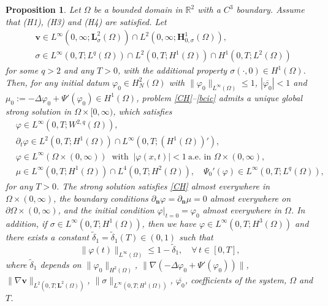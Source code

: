\documentclass[11pt,reqno]{amsart}
\newtheorem{proposition}{\textbf{Proposition}}[section]
\def\be{\begin{equation}}
\def\ee{\end{equation}}
\def\H{\bm{H}}
\def\L{\bm{L}}
\def\n{{\bm{n}}}
\def\vv{\bm{v}}
\begin{document}
\begin{proposition}
\label{CH-strong}
Let $\Omega$ be a bounded domain in $\mathbb{R}^2$ with a $C^3$ boundary. Assume that (H1), (H3) and (H4) are satisfied.
Let
\begin{align*}
&\vv \in L^\infty(0, \infty;\L^2_\sigma(\Omega))
\cap L^2(0,\infty;\H^1_{0,\sigma}(\Omega)),\\
&\sigma \in  L^\infty(0,T; L^q(\Omega))\cap L^2(0,T; H^1(\Omega))\cap H^1(0,T;L^2(\Omega))
\end{align*}
%
for some $q>2$ and any $T>0$, with the additional property $\sigma(\cdot,0)\in H^1(\Omega)$.
Then, for any initial datum $\varphi_0 \in H^2_N(\Omega)$ with
$\| \varphi_0\|_{L^\infty(\Omega)}\leq 1$, $\left|\overline{\varphi_0}\right|<1$ and $\mu_0:=-\Delta \varphi_0+\Psi'(\varphi_0) \in H^1(\Omega)$,  problem  \eqref{CH}--\eqref{bcic} admits a unique global strong solution in $\Omega\times [0,\infty)$, which satisfies
%
\begin{equation}
\label{REG}
\begin{split}
&\varphi \in L^\infty(0,T;W^{2,q}(\Omega)),
\\
&\partial_t \varphi \in L^2(0,T;H^1(\Omega)) \cap  L^\infty(0,T; (H^1(\Omega))'),
\\
&\varphi \in L^{\infty}(\Omega\times (0,\infty)) \ \text{ with } \ |\varphi(x,t)|<1
\ \text{a.e. in } \Omega\times (0,\infty),
\\
&\mu \in L^{\infty}(0,T; H^1(\Omega))\cap L^4(0,T;H^2(\Omega)),
\quad\Psi_0'(\varphi) \in L^\infty(0,T; L^q(\Omega)),
\end{split}
\end{equation}
%
for any $T>0$.
The strong solution satisfies \eqref{CH} almost everywhere in $\Omega \times (0,\infty)$, the boundary conditions $\partial_\n \varphi=\partial_\n \mu=0$ almost everywhere on
$\partial\Omega\times(0,\infty)$, and the initial condition $\varphi|_{t=0}=\varphi_0$ almost everywhere in $\Omega$.
%
%
In addition, if $\sigma \in L^\infty(0,T; H^1(\Omega))$, then we have $\varphi\in L^\infty(0,T;H^3(\Omega))$ and there exists a constant $\widetilde{\delta}_1=\widetilde{\delta}_1(T)\in (0,1)$ such that
\be
\|\varphi(t)\|_{L^{\infty}(\Omega)} \leq 1-\widetilde{\delta}_1,\quad \forall\, t \in[0,T],\label{sep1-ch}
\ee
where $\widetilde{\delta}_1$ depends on  $\|\varphi_0\|_{H^2(\Omega)}$, $\|\nabla (-\Delta \varphi_0+\Psi'(\varphi_0))\|$, $\|\nabla \vv\|_{L^2(0,T;\L^2(\Omega))}$, $\|\sigma\|_{L^\infty(0,T;H^1(\Omega))}$, $\overline{\varphi_0}$, coefficients of the system, $\Omega$ and $T$.
\end{proposition}
\end{document}
